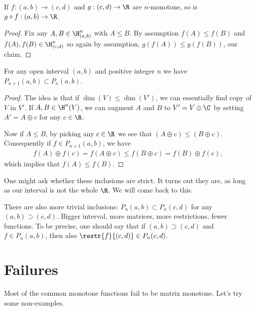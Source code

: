 \begin{prop}
	If $f : (a, b) \to (c, d)$ and $g : (c, d) \to \R$ are $n$-monotone, so is $g \circ f : (a, b) \to \R$.
\end{prop}
\begin{proof}
	Fix any $A, B \in \H^{n}_{(a, b)}$ with $A \leq B$. By assumption $f(A) \leq f(B)$ and $f(A), f(B) \in \H^{n}_{(c, d)}$ so again by assumption, $g(f(A)) \leq g(f(B))$, our claim.
\end{proof}

\begin{prop}
	For any open interval $(a, b)$ and positive integer $n$ we have $P_{n + 1}(a, b) \subset P_{n}(a, b)$.
\end{prop}
\begin{proof}
	The idea is that if $\dim(V) \leq \dim(V')$, we can essentially find copy of $V$ in $V'$. If $A, B \in \H^{n}(V)$, we can augment $A$ and $B$ to $V' = V \oplus \C$ by setting $A' = A \oplus c$ for any $c \in \R$.

	Now if $A \leq B$, by picking any $c \in \R$ we see that $(A \oplus c) \leq (B \oplus c)$. Consequently if $f \in P_{n + 1}(a, b)$, we have
	\begin{align*}
		f(A) \oplus f(c) = f(A \oplus c) \leq f(B \oplus c) = f(B) \oplus f(c),
	\end{align*}
	which implies that $f(A) \leq f(B)$.
\end{proof}

One might ask whether these inclusions are strict. It turns out they are, as long as our interval is not the whole $\R$. We will come back to this.

There are also more trivial inclusions: $P_{n}(a, b) \subset P_{n}(c, d)$ for any $(a, b) \supset (c, d)$. Bigger interval, more matrices, more restrictions, fewer functions. To be precise, one should say that if $(a, b) \supset (c, d)$ and $f \in P_{n}(a, b)$, then also $\restr{f}{(c, d)} \in P_{n}(c, d)$.

\section{Failures}

Most of the common monotone functions fail to be matrix monotone. Let's try some non-examples.

